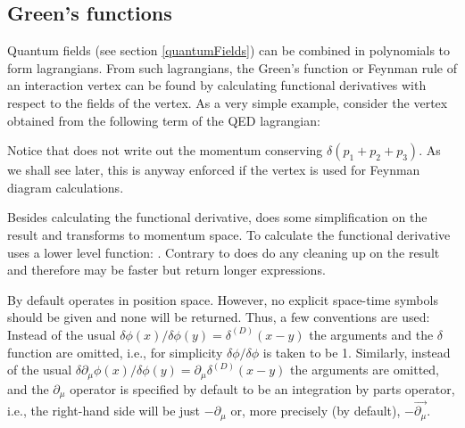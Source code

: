 \subsection{Green's functions}
\label{Green}

Quantum fields (see section \ref{quantumFields}) can be combined in polynomials to form lagrangians. From such lagrangians, the Green's function or Feynman rule of an interaction vertex can be found by calculating functional derivatives with respect to the fields of the vertex. As a very simple example, consider the vertex obtained from the following term of the QED lagrangian:

\beom
{}
\enom

Notice that  does not write out the momentum conserving $\delta(p_1+p_2+p_3)$. As we shall see later, this is anyway enforced if the vertex is used for Feynman diagram calculations.

Besides calculating the functional derivative,  does some simplification on the result and transforms to momentum space. To calculate the functional derivative  uses a lower level function: . Contrary to   does do any cleaning up on the result and therefore may be faster but return longer expressions.

By default  operates in position space. However, no explicit space-time symbols should be given and none will be returned. Thus, a few conventions are used: Instead of the usual $\delta \phi(x)/\delta \phi(y) = \delta^{(D)}(x-y)$ the arguments and the $\delta$ function are omitted, i.e., for simplicity $\delta \phi/\delta \phi$ is taken to be 1. Similarly, instead of the usual $\delta \partial_\mu \phi(x)/\delta \phi(y) = \partial_\mu  \delta^{(D)}(x-y)$ the arguments are omitted, and the $\partial_\mu$ operator is specified by default to be an integration by parts operator, i.e., the right-hand side will be just $-\partial_\mu$ or, more precisely (by default), $-\overrightarrow{\partial_\mu}$.

